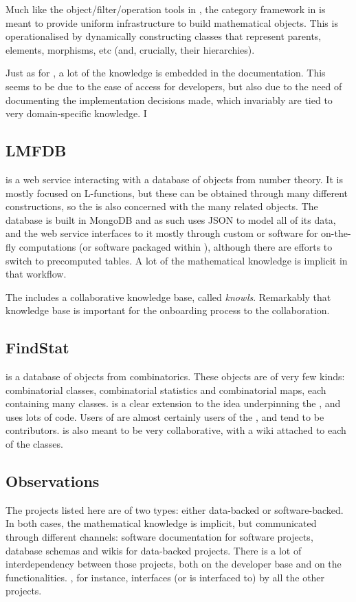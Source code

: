 Much like the object/filter/operation tools in \GAP, the category framework in \SageMath is meant to provide uniform infrastructure to build mathematical objects. This is operationalised by dynamically constructing classes that represent parents, elements, morphisms, etc (and, crucially, their hierarchies). 

Just as for \GAP, a lot of the knowledge is embedded in the documentation. This seems to be due to the ease of access for developers, but also due to the need of documenting the implementation decisions made, which invariably are tied to very domain-specific knowledge. 
I
\subsection{LMFDB}
\LMFDB \cite{lmfdb} is a  web service interacting with a database of objects from number theory. It is mostly focused on 
L-functions, but these can be obtained through many different constructions, so the \LMFDB is also concerned with the many related objects. The database is built in MongoDB and as such uses JSON to model all of its data, and the web service interfaces to it mostly through custom \python or \SageMath software for on-the-fly computations (or software packaged within \SageMath), although there are efforts to switch to precomputed tables. A lot of the mathematical knowledge is implicit in that workflow. 

The \LMFDB includes a collaborative knowledge base, called \emph{knowls}. Remarkably that knowledge base is important for the onboarding process to the collaboration. 

\subsection{FindStat}
\FindStat \cite{findstat} is a database of objects from combinatorics. These objects are of very few kinds: combinatorial classes, combinatorial statistics and combinatorial maps, each containing many classes. \FindStat is a clear extension to the idea underpinning the \OEIS, and uses lots of \SageMath code. Users of \FindStat are almost certainly users of the \OEIS, and tend to be \SageMath contributors. \FindStat is also meant to be very collaborative, with a wiki attached to each of the classes.

\subsection{Observations}

The projects listed here are of two types: either data-backed or software-backed. In both cases, the mathematical knowledge is implicit, but communicated through different channels: software documentation for software projects, database schemas and wikis for data-backed projects. There is a lot of interdependency between those projects, both on the developer base and on the functionalities. \SageMath, for instance, interfaces (or is interfaced to) by all the other projects. 


